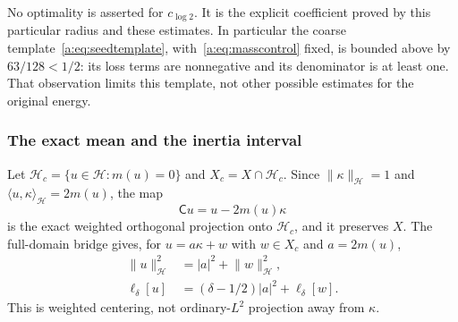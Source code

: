 \documentclass[11pt,a4paper]{article}
\numberwithin{equation}{section}
\theoremstyle{definition}\newtheorem{definition}[theorem]{Definition}
\theoremstyle{remark}\newtheorem{remark}[theorem]{Remark}
\newcommand{\Hh}{\mathcal H}\newcommand{\Hw}{\mathcal H}
\newcommand{\ip}[2]{\langle#1,#2\rangle}\newcommand{\norm}[1]{\lVert#1\rVert}\newcommand{\abs}[1]{\lvert#1\rvert}
\begin{document}
No optimality is asserted for $c_{\log2}$. It is the explicit coefficient proved by this particular radius and these estimates. In particular the coarse template~\eqref{a:eq:seedtemplate}, with~\eqref{a:eq:masscontrol} fixed, is bounded above by $63/128<1/2$: its loss terms are nonnegative and its denominator is at least one. That observation limits this template, not other possible estimates for the original energy.

\subsubsection{The exact mean and the inertia interval}

Let $\Hh_c=\{u\in\Hw:m(u)=0\}$ and $X_c=X\cap \Hh_c$. Since
$\norm\kappa_{\Hh}=1$ and $\ip u\kappa_{\Hh}=2m(u)$, the map
\begin{equation}\label{a:eq:centering}
 \mathsf C u=u-2m(u)\kappa
\end{equation}
is the exact weighted orthogonal projection onto $\Hh_c$, and it preserves $X$. The full-domain bridge gives, for $u=a\kappa+w$ with $w\in X_c$ and $a=2m(u)$,
\begin{align}
 \norm u_{\Hh}^2&=|a|^2+\norm w_{\Hh}^2,\label{a:eq:meansplitnorm}\\
 \ell_\delta[u]&=(\delta-1/2)|a|^2+\ell_\delta[w].\label{a:eq:meansplit}
\end{align}
This is weighted centering, not ordinary-$L^2$ projection away from $\kappa$.
\end{document}
